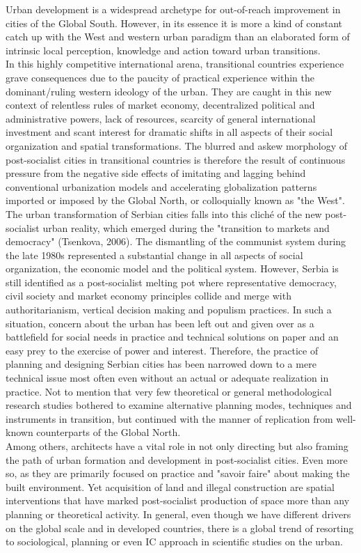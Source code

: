 \documentclass[11pt]{report}
\begin{document}
Urban development is a widespread archetype for out-of-reach improvement in cities of the Global South. However, in its essence it is more a kind of constant catch up with the West and western urban paradigm than an elaborated form of intrinsic local perception, knowledge and action toward urban transitions. 
\\
In this highly competitive international arena, transitional countries experience grave consequences due to the paucity of practical experience within the dominant/ruling western ideology of the urban. They are caught in this new context of relentless rules of market economy, decentralized political and administrative powers, lack of resources, scarcity of general international investment and scant interest for dramatic shifts in all aspects of their social organization and spatial transformations. The blurred and askew morphology of post-socialist cities in transitional countries is therefore the result of continuous pressure from the negative side effects of imitating and lagging behind conventional urbanization models and accelerating globalization patterns imported or imposed by the Global North, or colloquially known as "the West".
\\
The urban transformation of Serbian cities falls into this cliché of the new post-socialist urban reality, which emerged during the "transition to markets and democracy" (Tsenkova, 2006). The dismantling of the communist system during the late 1980s represented a substantial change in all aspects of social organization, the economic model and the political system. However, Serbia is still identified as a post-socialist melting pot where representative democracy, civil society and market economy principles collide and merge with authoritarianism, vertical decision making and populism practices. In such a situation, concern about the urban has been left out and given over as a battlefield for social needs in practice and technical solutions on paper and an easy prey to the exercise of power and interest. Therefore, the practice of planning and designing Serbian cities has been narrowed down to a mere technical issue most often even without an actual or adequate realization in practice. Not to mention that very few theoretical or general methodological research studies bothered to examine alternative planning modes, techniques and instruments in transition, but continued with the manner of replication from well-known counterparts of the Global North.
\\
Among others, architects have a vital role in not only directing but also framing the path of urban formation and development in post-socialist cities. Even more so, as they are primarily focused on practice and "savoir faire" about making the built environment. Yet acquisition of land and illegal construction are spatial interventions that have marked post-socialist production of space more than any planning or theoretical activity. In general, even though we have different drivers on the global scale and in developed countries, there is a global trend of resorting to sociological, planning or even IC approach in scientific studies on the urban. 
\end{document}
